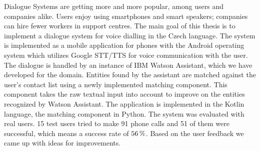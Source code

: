 \documentclass[12pt]{report}
\begin{document}

Dialogue Systems are getting more and more popular, among users and companies alike.
Users enjoy using smartphones and smart speakers; companies can hire fewer workers in support
centres. The main goal of this thesis is to implement a dialogue system for voice dialling in
the Czech language. The system is implemented as a mobile application for phones with
the Android operating system which utilizes Google STT/TTS for voice communication
with the user. The dialogue is handled by an instance of IBM Watson Assistant, which we
have developed for the domain. Entities found by the assistant are matched against the
user's contact list using a newly implemented matching component. This component takes
the raw textual input into account to improve on the entities recognized by Watson Assistant.
The application is implemented in the Kotlin language, the matching component in Python.
The system was evaluated with real users. 15 test users tried to make 91 phone
calls and 51 of them were successful, which means a success rate of \(56\,\rm \%\). Based on the
user feedback we came up with ideas for improvements.
\end{document}
